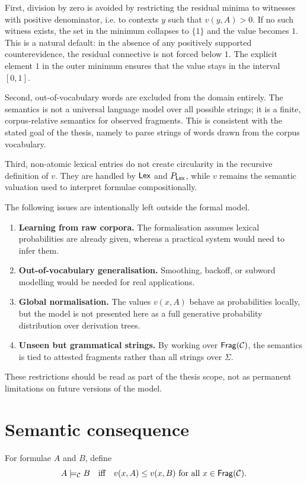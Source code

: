 First, division by zero is avoided by restricting the residual minima to witnesses with positive
denominator, i.e. to contexts $y$ such that $v(y,A)>0$. If no such witness exists, the set in the
minimum collapses to $\{1\}$ and the value becomes $1$. This is a natural default: in the absence
of any positively supported counterevidence, the residual connective is not forced below $1$.
The explicit element $1$ in the outer minimum ensures that the value stays in the interval
$[0,1]$.

Second, out-of-vocabulary words are excluded from the domain entirely. The semantics is not a
universal language model over all possible strings; it is a finite, corpus-relative semantics for
observed fragments. This is consistent with the stated goal of the thesis, namely to parse strings
of words drawn from the corpus vocabulary.

Third, non-atomic lexical entries do not create circularity in the recursive definition of $v$.
They are handled by $\mathsf{Lex}$ and $P_{\mathsf{Lex}}$, while $v$ remains the semantic valuation used to
interpret formulae compositionally.

\begin{remark}
The following issues are intentionally left outside the formal model.
\begin{enumerate}[label=(\alph*)]
    \item \textbf{Learning from raw corpora.} The formalisation assumes lexical probabilities are
    already given, whereas a practical system would need to infer them.
    \item \textbf{Out-of-vocabulary generalisation.} Smoothing, backoff, or subword modelling would be
    needed for real applications.
    \item \textbf{Global normalisation.} The values $v(x,A)$ behave as probabilities locally, but the model is
    not presented here as a full generative probability distribution over derivation trees.
    \item \textbf{Unseen but grammatical strings.} By working over $\mathsf{Frag}(\mathcal C)$, the semantics is tied to
    attested fragments rather than all strings over $\Sigma$.
\end{enumerate}
These restrictions should be read as part of the thesis scope, not as permanent limitations on
future versions of the model.
\end{remark}


\section{Semantic consequence}
\begin{definition}
For formulae $A$ and $B$, define
\[
A \models_{\mathcal C} B
\quad\text{iff}\quad
v(x,A) \leq v(x,B) \text{ for all } x \in \mathsf{Frag}(\mathcal C).
\]
\end{definition}

